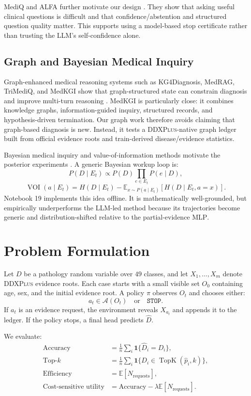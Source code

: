 \documentclass[11pt]{article}
\newcommand{\ddx}{\textsc{DDXPlus}}
\newcommand{\mlp}{\textsc{MLP}}
\newcommand{\llm}{\textsc{LLM}}
\begin{document}
MediQ and ALFA further motivate our design \cite{mediq,alfa}. They show that asking useful clinical questions is difficult and that confidence/abstention and structured question quality matter. This supports using a model-based stop certificate rather than trusting the \llm{}'s self-confidence alone.

\subsection{Graph and Bayesian Medical Inquiry}

Graph-enhanced medical reasoning systems such as KG4Diagnosis, MedRAG, TriMediQ, and MedKGI show that graph-structured state can constrain diagnosis and improve multi-turn reasoning \cite{kg4diagnosis,medrag,trimediq,medkgi}. MedKGI is particularly close: it combines knowledge graphs, information-guided inquiry, structured records, and hypothesis-driven termination. Our graph work therefore avoids claiming that graph-based diagnosis is new. Instead, it tests a \ddx{}-native graph ledger built from official evidence roots and train-derived disease/evidence statistics.

Bayesian medical inquiry and value-of-information methods motivate the posterior experiments \cite{bayesinquiry,entropytest}. A generic Bayesian workup loop is:
\[
P(D \mid E_t) \propto P(D) \prod_{e \in E_t} P(e \mid D),
\]
\[
\operatorname{VOI}(a \mid E_t) = H(D \mid E_t) - \mathbb{E}_{x \sim P(a \mid E_t)}[H(D \mid E_t, a=x)].
\]
Notebook 19 implements this idea offline. It is mathematically well-grounded, but empirically underperforms the \llm{}-led method because its trajectories become generic and distribution-shifted relative to the partial-evidence \mlp{}.

\section{Problem Formulation}

Let $D$ be a pathology random variable over $49$ classes, and let $X_1,\ldots,X_m$ denote \ddx{} evidence roots. Each case starts with a small visible set $O_0$ containing age, sex, and the initial evidence root. A policy $\pi$ observes $O_t$ and chooses either:
\[
a_t \in \mathcal{A}(O_t) \quad \text{or} \quad \texttt{STOP}.
\]
If $a_t$ is an evidence request, the environment reveals $X_{a_t}$ and appends it to the ledger. If the policy stops, a final head predicts $\hat{D}$.

We evaluate:
\begin{align*}
\text{Accuracy} &= \frac{1}{n}\sum_i \mathbf{1}\{\hat{D}_i = D_i\},\\
\text{Top-}k &= \frac{1}{n}\sum_i \mathbf{1}\{D_i \in \operatorname{TopK}(\hat{p}_i,k)\},\\
\text{Efficiency} &= \mathbb{E}[N_{\text{requests}}],\\
\text{Cost-sensitive utility} &= \text{Accuracy} - \lambda \mathbb{E}[N_{\text{requests}}].
\end{align*}
\end{document}
